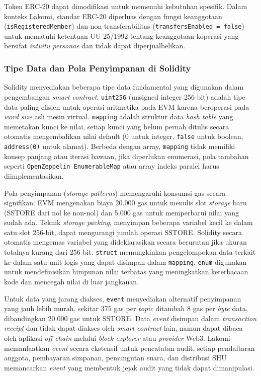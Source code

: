 Token ERC-20 dapat dimodifikasi untuk memenuhi kebutuhan spesifik. Dalam konteks Lakomi, standar ERC-20 diperluas dengan fungsi keanggotaan (\texttt{isRegisteredMember}) dan non-transferabilitas (\texttt{transfersEnabled = false}) untuk mematuhi ketentuan UU 25/1992 tentang keanggotaan koperasi yang bersifat \textit{intuitu personae} dan tidak dapat diperjualbelikan.

\subsubsection{Tipe Data dan Pola Penyimpanan di Solidity}

Solidity menyediakan beberapa tipe data fundamental yang digunakan dalam pengembangan \textit{smart contract}. \texttt{uint256} (unsigned integer 256-bit) adalah tipe data paling efisien untuk operasi aritmetika pada EVM karena beroperasi pada \textit{word size} asli mesin virtual. \texttt{mapping} adalah struktur data \textit{hash table} yang memetakan kunci ke nilai, setiap kunci yang belum pernah ditulis secara otomatis mengembalikan nilai default (0 untuk integer, \texttt{false} untuk boolean, \texttt{address(0)} untuk alamat). Berbeda dengan array, \texttt{mapping} tidak memiliki konsep panjang atau iterasi bawaan, jika diperlukan enumerasi, pola tambahan seperti \texttt{OpenZeppelin EnumerableMap} atau array indeks paralel harus diimplementasikan.

Pola penyimpanan (\textit{storage patterns}) memengaruhi konsumsi gas secara signifikan. EVM mengenakan biaya 20.000 gas untuk menulis slot \textit{storage} baru (SSTORE dari nol ke non-nol) dan 5.000 gas untuk memperbarui nilai yang sudah ada. Teknik \textit{storage packing}, menyimpan beberapa variabel kecil ke dalam satu slot 256-bit, dapat mengurangi jumlah operasi SSTORE. Solidity secara otomatis mengemas variabel yang dideklarasikan secara berurutan jika ukuran totalnya kurang dari 256 bit. \texttt{struct} memungkinkan pengelompokan data terkait ke dalam satu unit logis yang dapat disimpan dalam \texttt{mapping}. \texttt{enum} digunakan untuk mendefinisikan himpunan nilai terbatas yang meningkatkan keterbacaan kode dan mencegah nilai di luar jangkauan.

Untuk data yang jarang diakses, \texttt{event} menyediakan alternatif penyimpanan yang jauh lebih murah, sekitar 375 gas per \textit{topic} ditambah 8 gas per \textit{byte} data, dibandingkan 20.000 gas untuk SSTORE. Data \textit{event} disimpan dalam \textit{transaction receipt} dan tidak dapat diakses oleh \textit{smart contract} lain, namun dapat dibaca oleh aplikasi \textit{off-chain} melalui \textit{block explorer} atau \textit{provider} Web3. Lakomi memanfaatkan \textit{event} secara ekstensif untuk pencatatan audit, setiap pendaftaran anggota, pembayaran simpanan, pemungutan suara, dan distribusi SHU memancarkan \textit{event} yang membentuk jejak audit yang tidak dapat dimanipulasi.

